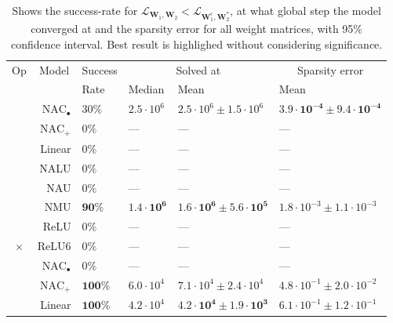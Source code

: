 \begin{table}[!h]

\caption{\label{tab:function-task-static-defaults-all}Shows the success-rate for $\mathcal{L}_{\mathbf{W}_1, \mathbf{W}_2} < \mathcal{L}_{\mathbf{W}_1^\epsilon, \mathbf{W}_2^*}$, at what global step the model converged at and the sparsity error for all weight matrices, with 95\% confidence interval. Best result is highlighed without considering significance.}
\centering
\begin{tabular}{crllll}
\toprule
\multicolumn{1}{c}{Op} & \multicolumn{1}{c}{Model} & \multicolumn{1}{c}{Success} & \multicolumn{2}{c}{Solved at} & \multicolumn{1}{c}{Sparsity error} \\
\cmidrule(l{3pt}r{3pt}){1-1} \cmidrule(l{3pt}r{3pt}){2-2} \cmidrule(l{3pt}r{3pt}){3-3} \cmidrule(l{3pt}r{3pt}){4-5} \cmidrule(l{3pt}r{3pt}){6-6}
 &  & Rate & Median & Mean & Mean\\
\midrule
 & $\mathrm{NAC}_{\bullet}$ & $30\%$ & $2.5 \cdot 10^{6}$ & $2.5 \cdot 10^{6} \pm 1.5 \cdot 10^{6}$ & $\mathbf{3.9 \cdot 10^{-4} \pm 9.4 \cdot 10^{-4}}$\\

 & $\mathrm{NAC}_{+}$ & $0\%$ & --- & --- & ---\\

 & Linear & $0\%$ & --- & --- & ---\\

 & NALU & $0\%$ & --- & --- & ---\\

 & NAU & $0\%$ & --- & --- & ---\\

 & NMU & $\mathbf{90\%}$ & $\mathbf{1.4 \cdot 10^{6}}$ & $\mathbf{1.6 \cdot 10^{6} \pm 5.6 \cdot 10^{5}}$ & $1.8 \cdot 10^{-3} \pm 1.1 \cdot 10^{-3}$\\

 & ReLU & $0\%$ & --- & --- & ---\\

\multirow{-8}{*}{\centering\arraybackslash $\bm{\times}$} & ReLU6 & $0\%$ & --- & --- & ---\\
\cmidrule{1-6}
 & $\mathrm{NAC}_{\bullet}$ & $0\%$ & --- & --- & ---\\

 & $\mathrm{NAC}_{+}$ & $\mathbf{100\%}$ & $6.0 \cdot 10^{4}$ & $7.1 \cdot 10^{4} \pm 2.4 \cdot 10^{4}$ & $4.8 \cdot 10^{-1} \pm 2.0 \cdot 10^{-2}$\\

 & Linear & $\mathbf{100\%}$ & $4.2 \cdot 10^{4}$ & $\mathbf{4.2 \cdot 10^{4} \pm 1.9 \cdot 10^{3}}$ & $6.1 \cdot 10^{-1} \pm 1.2 \cdot 10^{-1}$\\


\end{tabular}
\end{table}
